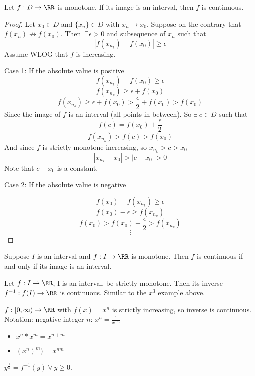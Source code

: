 \documentclass[12pt]{scrartcl}
\begin{document}
\begin{theorem}
  Let $f: D \to \RR$ is monotone. If its image is an interval, then $f$ is continuous.
  \begin{proof}
    Let $x_0 \in D$ and $\{x_n\} \in D$ with $x_n \to x_0$. Suppose on the contrary that 
    $f(x_n) \not\to f(x_0)$. Then $\ \exists \epsilon > 0$ and subsequence of $x_n$ such that 
    \[|f(x_{n_k}) - f(x_0)| \geq \epsilon\]
    Assume WLOG that $f$ is increasing. 

    Case 1: If the absolute value is positive
    \[f(x_{n_k}) - f(x_0) \geq \epsilon\]
    \[f(x_{n_k}) \geq \epsilon + f(x_0)\]
    \[f(x_{n_k}) \geq \epsilon + f(x_0) > \frac{\epsilon}{2} + f(x_0) > f(x_0)\]
    Since the image of $f$ is an interval (all points in between). So $\exists \ c \in D$ such that 
    \[f(c) = f(x_0) + \frac{\epsilon}{2}\]
    \[f(x_{n_k}) > f(c) > f(x_0)\]
    And since $f$ is strictly monotone increasing, so $x_{n_k} > c > x_0$
    \[|x_{n_k} - x_0| > |c - x_0| > 0\]
    Note that $c - x_0$ is a constant.

    Case 2: If the absolute value is negative

    \[f(x_0) - f(x_{n_k}) \geq \epsilon\]
    \[f(x_0) - \epsilon \geq f(x_{n_k})\]
    \[f(x_0) > f(x_0) - \frac{\epsilon}{2} > f(x_{n_k})\]
    \[\vdots\]
  \end{proof}
\end{theorem}

\begin{theorem}
  Suppose $I$ is an interval and $f: I \to \RR$ is monotone. Then $f$ is continuous
  if and only if its image is an interval.
\end{theorem}

\begin{theorem}
  Let $f: I \to \RR$, I is an interval, be strictly monotone. Then its inverse 
  $f^{-1}: f(I) \to \RR$ is continuous. Similar to the $x^3$ example above.
\end{theorem}

\begin{example}
  $f: [0, \infty) \to \RR$ with $f(x) = x^n$ is strictly increasing, so inverse 
  is continuous. Notation: negative integer $n$: $x^n = \frac{1}{x^{-n}}$
  \begin{itemize}
    \item $x^n * x^m = x^{n + m}$
    \item $(x^n)^m) = x^{nm}$
  \end{itemize}
  $y^{\frac{1}{n}} = f^{-1}(y) \ \forall \ y \geq 0$.
\end{example}
\end{document}
